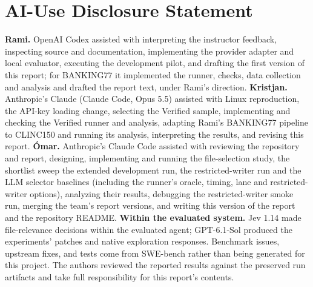 \documentclass{article}
\begin{document}
\section*{AI-Use Disclosure Statement}
\textbf{Rami.} OpenAI Codex assisted with interpreting the instructor feedback, inspecting source and documentation, implementing the provider adapter and local evaluator, executing the development pilot, and drafting the first version of this report; for BANKING77 it implemented the runner, checks, data collection and analysis and drafted the report text, under Rami's direction.
\textbf{Kristjan.} Anthropic's Claude (Claude Code, Opus 5.5) assisted with Linux reproduction, the API-key loading change, selecting the Verified sample, implementing and checking the Verified runner and analysis, adapting Rami's BANKING77 pipeline to CLINC150 and running its analysis, interpreting the results, and revising this report.
\textbf{\'Omar.} Anthropic's Claude Code assisted with reviewing the repository and report, designing, implementing and running the file-selection study, the shortlist sweep the extended development run, the restricted-writer run and the LLM selector baselines (including the runner's oracle, timing, lane and restricted-writer options), analyzing their results, debugging the restricted-writer smoke run, merging the team's report versions, and writing this version of the report and the repository README.
\textbf{Within the evaluated system.} Jev 1.14 made file-relevance decisions within the evaluated agent; GPT-6.1-Sol produced the experiments' patches and native exploration responses. Benchmark issues, upstream fixes, and tests come from SWE-bench rather than being generated for this project. The authors reviewed the reported results against the preserved run artifacts and take full responsibility for this report's contents.
\end{document}
